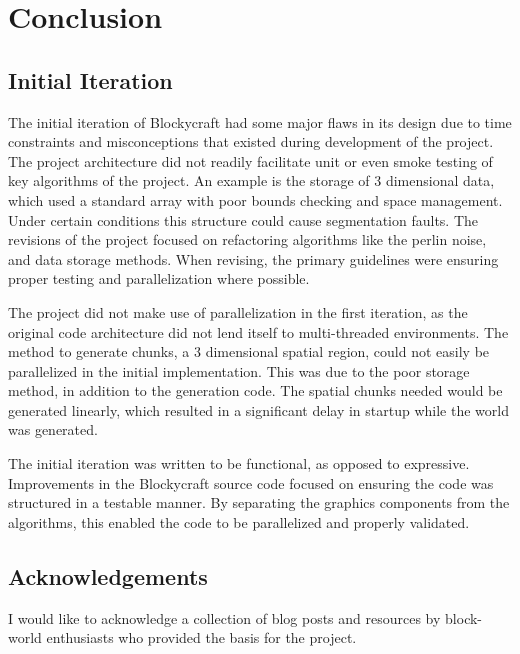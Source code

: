 \documentclass[a4paper,11pt,titlepage]{scrartcl}
\newcommand{\Blockycraft}{Blockycraft}
\begin{document}

\section{Conclusion}
\subsection{Initial Iteration}
The initial iteration of \Blockycraft{} had some major flaws in its design due to time constraints and misconceptions that existed during development of the project. The project architecture did not readily facilitate unit or even smoke testing of key algorithms of the project. An example is the storage of 3 dimensional data, which used a standard array with poor bounds checking and space management. Under certain conditions this structure could cause segmentation faults. The revisions of the project focused on refactoring algorithms like the perlin noise, and data storage methods. When revising, the primary guidelines were ensuring proper testing and parallelization where possible. 

The project did not make use of parallelization in the first iteration, as the original code architecture did not lend itself to multi-threaded environments. The method to generate chunks, a 3 dimensional spatial region, could not easily be parallelized in the initial implementation. This was due to the poor storage method, in addition to the generation code. The spatial chunks needed would be generated linearly, which resulted in a significant delay in startup while the world was generated.

The initial iteration was written to be functional, as opposed to expressive. Improvements in the \Blockycraft{} source code focused on ensuring the code was structured in a testable manner. By separating the graphics components from the algorithms, this enabled the code to be parallelized and properly validated.

\subsection{Acknowledgements}
I would like to acknowledge a collection of blog posts and resources by block-world enthusiasts who provided the basis for the project.
\end{document}

